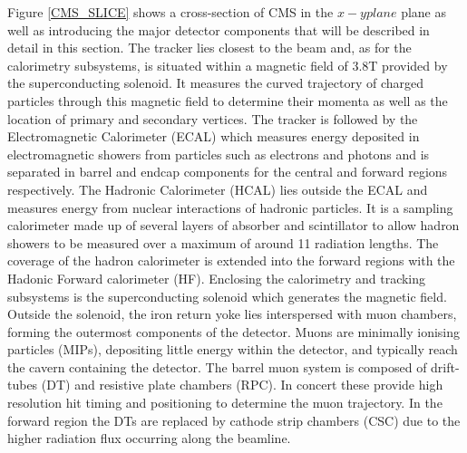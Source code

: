 Figure \ref{CMS_SLICE} shows a cross-section of CMS in the $x-y plane$ plane as well as introducing the major detector components that will be described 
in detail in this section. The tracker lies closest to the beam and, as for the calorimetry subsystems, is situated within a magnetic field of 3.8T provided
by the superconducting solenoid. It measures the curved trajectory of charged particles through this magnetic field to determine their momenta 
as well as the location of primary and secondary vertices. The tracker is followed by the Electromagnetic Calorimeter (ECAL)
which measures energy deposited in electromagnetic showers from particles such as electrons and photons and is separated in barrel and endcap 
components for the central and forward regions respectively. The Hadronic Calorimeter (HCAL) lies outside the 
ECAL and measures energy from nuclear interactions of hadronic particles. It is a sampling calorimeter
made up of several layers of absorber and scintillator to allow hadron showers to be measured over a maximum of around 11 radiation lengths. 
The coverage of the hadron calorimeter is extended into the forward regions with the Hadonic Forward calorimeter (HF). Enclosing the calorimetry and tracking subsystems 
is the superconducting solenoid which generates the magnetic field. Outside the solenoid, the iron return yoke lies interspersed with muon chambers, forming the outermost components of the detector. 
Muons are minimally ionising particles (MIPs), depositing little energy within the detector, and typically reach the cavern containing the detector. 
The barrel muon system is composed of drift-tubes (DT) and resistive plate chambers (RPC). In concert these provide
high resolution hit timing and positioning to determine the muon trajectory. In the forward region the DTs are replaced by cathode strip chambers 
(CSC) due to the higher radiation flux occurring along the beamline. 

